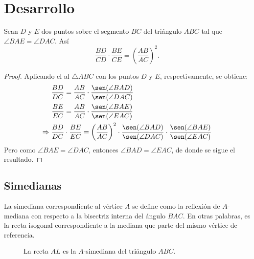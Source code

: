\section{Desarrollo}

\begin{section-theorem.tcb}[Steiner]\label{steiner-theorem}
    Sean $D$ y $E$ dos puntos sobre el segmento $BC$ del triángulo $ABC$ tal que $\angle BAE = \angle DAC$.
    Así
    \[
        \frac{BD}{CD} \cdot \frac{BE}{CE} = \left(\frac{AB}{AC}\right)^2.
    \]
\end{section-theorem.tcb}
\begin{figure}[H]
    \centering
    
\end{figure}
\begin{proof}
    Aplicando el   al $\triangle ABC$ con los puntos $D$ y $E$, respectivamente, se obtiene:
    \begin{align*}
        \frac{BD}{DC} &= \frac{AB}{AC} \cdot \frac{\sen(\angle BAD)}{\sen(\angle DAC)}\\
        \frac{BE}{EC} &= \frac{AB}{AC} \cdot \frac{\sen(\angle BAE)}{\sen(\angle EAC)}\\
        \Rightarrow \frac{BD}{DC} &\cdot \frac{BE}{EC} = \left(\frac{AB}{AC}\right)^2 \cdot \frac{\sen(\angle BAD)}{\sen(\angle DAC)} \cdot \frac{\sen(\angle BAE)}{\sen(\angle EAC)}\\
    \end{align*}
    Pero como $\angle BAE = \angle DAC$, entonces $\angle BAD = \angle EAC$, de donde se sigue el resultado.
\end{proof}



\subsection{Simedianas}


\begin{section-definition.tcb}[Simediana]
    La simediana correspondiente al vértice $A$ se define como la reflexión de $A$\nobreakdash-mediana con respecto a la bisectriz interna del ángulo $BAC$.
    En otras palabras, es la recta isogonal correspondiente a la mediana que parte del mismo vértice de referencia.
\end{section-definition.tcb}
\begin{figure}[H]
    \centering
    
    \caption{La recta $AL$ es la $A$-simediana del triángulo $ABC$.}
    \label{fig:symmedian-definition}
\end{figure}

